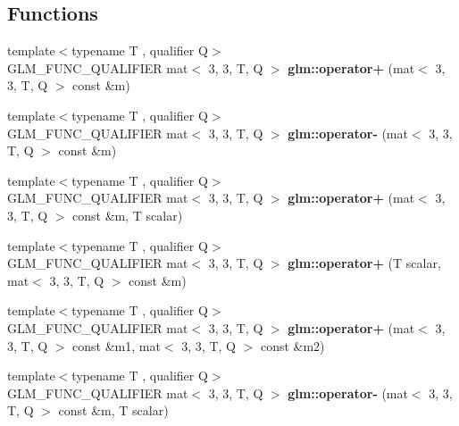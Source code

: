 \subsection*{Functions}
\begin{DoxyCompactItemize}
\item 
\mbox{\label{type__mat3x3_8inl_af4a24f06d91e950c3338a6fcf3ae860c}} 
{\footnotesize template$<$typename T , qualifier Q$>$ }\\G\+L\+M\+\_\+\+F\+U\+N\+C\+\_\+\+Q\+U\+A\+L\+I\+F\+I\+ER mat$<$ 3, 3, T, Q $>$ {\bfseries glm\+::operator+} (mat$<$ 3, 3, T, Q $>$ const \&m)
\item 
\mbox{\label{type__mat3x3_8inl_af2895c3e8acbc5da0e98094b6e29ed2d}} 
{\footnotesize template$<$typename T , qualifier Q$>$ }\\G\+L\+M\+\_\+\+F\+U\+N\+C\+\_\+\+Q\+U\+A\+L\+I\+F\+I\+ER mat$<$ 3, 3, T, Q $>$ {\bfseries glm\+::operator-\/} (mat$<$ 3, 3, T, Q $>$ const \&m)
\item 
\mbox{\label{type__mat3x3_8inl_a9821f6d808bd7419d2517a0372c4d422}} 
{\footnotesize template$<$typename T , qualifier Q$>$ }\\G\+L\+M\+\_\+\+F\+U\+N\+C\+\_\+\+Q\+U\+A\+L\+I\+F\+I\+ER mat$<$ 3, 3, T, Q $>$ {\bfseries glm\+::operator+} (mat$<$ 3, 3, T, Q $>$ const \&m, T scalar)
\item 
\mbox{\label{type__mat3x3_8inl_a7703e906dcce9ba3439b7f100b34e4f4}} 
{\footnotesize template$<$typename T , qualifier Q$>$ }\\G\+L\+M\+\_\+\+F\+U\+N\+C\+\_\+\+Q\+U\+A\+L\+I\+F\+I\+ER mat$<$ 3, 3, T, Q $>$ {\bfseries glm\+::operator+} (T scalar, mat$<$ 3, 3, T, Q $>$ const \&m)
\item 
\mbox{\label{type__mat3x3_8inl_a16c9d9ea3cf7f6bb3f9cd95d525453f9}} 
{\footnotesize template$<$typename T , qualifier Q$>$ }\\G\+L\+M\+\_\+\+F\+U\+N\+C\+\_\+\+Q\+U\+A\+L\+I\+F\+I\+ER mat$<$ 3, 3, T, Q $>$ {\bfseries glm\+::operator+} (mat$<$ 3, 3, T, Q $>$ const \&m1, mat$<$ 3, 3, T, Q $>$ const \&m2)
\item 
\mbox{\label{type__mat3x3_8inl_a96aef508c0b069eacfc88a4aa08a4c5a}} 
{\footnotesize template$<$typename T , qualifier Q$>$ }\\G\+L\+M\+\_\+\+F\+U\+N\+C\+\_\+\+Q\+U\+A\+L\+I\+F\+I\+ER mat$<$ 3, 3, T, Q $>$ {\bfseries glm\+::operator-\/} (mat$<$ 3, 3, T, Q $>$ const \&m, T scalar)

\end{DoxyCompactItemize}
